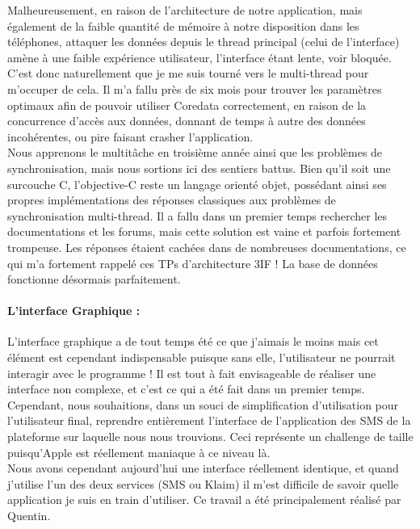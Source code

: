 \documentclass{article}
\begin{document}
		Malheureusement, en raison de l'architecture de notre application, mais également de la faible quantité de mémoire à notre disposition dans les téléphones, attaquer les données depuis le thread principal (celui de l'interface) amène à une faible expérience utilisateur, l'interface étant lente, voir bloquée. C'est donc naturellement que je me suis tourné vers le multi-thread pour m'occuper de cela. Il m'a fallu près de six mois pour trouver les paramètres optimaux afin de pouvoir utiliser Coredata correctement, en raison de la concurrence d'accès aux données, donnant de temps à autre des données incohérentes, ou pire faisant crasher l'application.\\
		
		Nous apprenons le multitâche en troisième année ainsi que les problèmes de synchronisation, mais nous sortions ici des sentiers battus. Bien qu'il soit une surcouche C, l'objective-C reste un langage orienté objet, possédant ainsi ses propres implémentations des réponses classiques aux problèmes de synchronisation multi-thread. Il a fallu dans un premier temps rechercher les documentations et les forums, mais cette solution est vaine et parfois fortement trompeuse. Les réponses étaient cachées dans de nombreuses documentations, ce qui m'a fortement rappelé ces TPs d'architecture 3IF ! La base de données fonctionne désormais parfaitement.\\
		
		\paragraph{L'interface Graphique :}
		L'interface graphique a de tout temps été ce que j'aimais le moins mais cet élément est cependant indispensable puisque sans elle, l'utilisateur ne pourrait interagir avec le programme ! Il est tout à fait envisageable de réaliser une interface non complexe, et c'est ce qui a été fait dans un premier temps. Cependant, nous souhaitions, dans un souci de simplification d'utilisation pour l'utilisateur final, reprendre entièrement l'interface de l'application des SMS de la plateforme sur laquelle nous nous trouvions. Ceci représente un challenge de taille puisqu'Apple est réellement maniaque à ce niveau là. \\
		
		Nous avons cependant aujourd'hui une interface réellement identique, et quand j'utilise l'un des deux services (SMS ou Klaim) il m'est difficile de savoir quelle application je suis en train d'utiliser. Ce travail a été principalement réalisé par Quentin.\\
		
\end{document}
